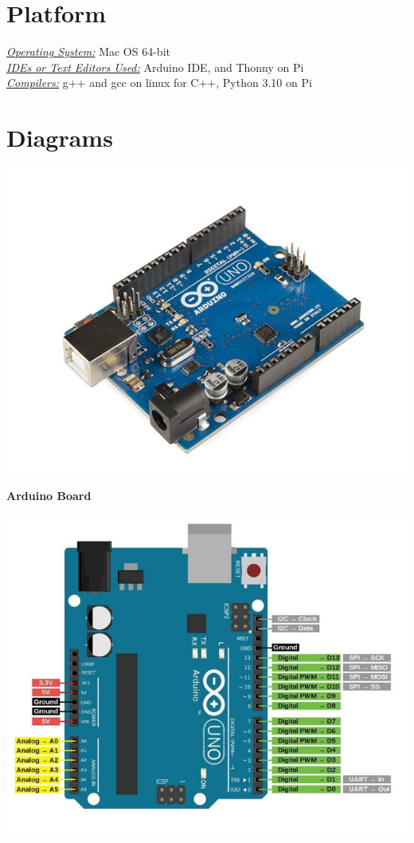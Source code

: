 \documentclass{article}
\begin{document}
\section{\textbf{Platform}}
\textit{\underline{Operating System:}} Mac OS 64-bit\\
\textit{\underline{IDEs or Text Editors Used:}} Arduino IDE, and Thonny on Pi\\ 
\textit{\underline{Compilers:}} g++ and gcc on linux for C++, Python 3.10 on Pi
\section{\textbf{Diagrams}}
\begin{center}
	\includegraphics[scale=0.4]{arduino.png}
\end{center}
\begin{center}
	\textbf{Arduino Board}
\end{center}
\vspace{10pt}
\begin{center}
	\includegraphics[scale=0.4]{arduinopindiagram.png}
\end{center}
\end{document}
